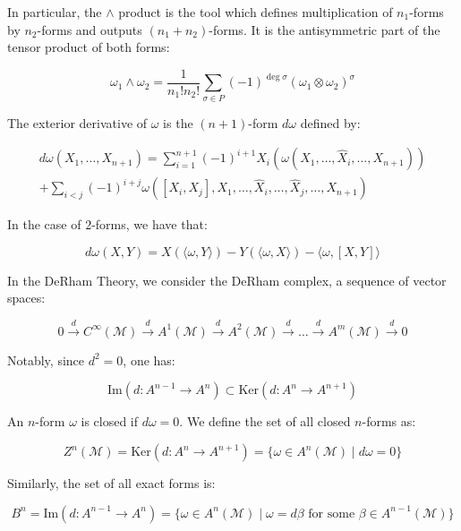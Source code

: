 \noindent In particular, the $\wedge$ product is the tool which defines multiplication of $n_{1}$-forms by $n_{2}$-forms and outputs $(n_{1} + n_{2})$-forms. It is the antisymmetric part of the tensor product of both forms:

\[
\omega_{1} \wedge \omega_{2} = \frac{1}{n_{1}! n_{2}!} \sum_{\sigma \in P} (-1)^{\deg \sigma} (\omega_{1} \otimes \omega_{2})^{\sigma}
\]

\begin{defn}
The exterior derivative of $\omega$ is the $(n+1)$-form $d \omega$ defined by:

\begin{align}
d\omega(X_{1}, \dots, X_{n+1}) = \sum_{i=1}^{n+1} (-1)^{i+1} X_{i}(\omega(X_{1}, \dots, \hat{X}_{i}, \dots, X_{n+1}))  \\
+ \sum_{i < j} (-1)^{i+j} \omega([X_{i}, X_{j}], X_{1}, \dots, \hat{X}_{i}, \dots, \hat{X}_{j}, \dots, X_{n+1})
\end{align}
\end{defn} 

\begin{remark}
\noindent In the case of $2$-forms, we have that:

\[
d \omega(X,Y) = X(\langle \omega, Y \rangle) - Y(\langle \omega, X \rangle) - \langle \omega, [X,Y] \rangle
\]
\end{remark}

\noindent In the DeRham Theory, we consider the DeRham complex, a sequence of vector spaces:

\[
0 \xrightarrow{d} C^{\infty}(\mathcal{M}) \xrightarrow{d} A^{1}(\mathcal{M}) \xrightarrow{d} A^2(\mathcal{M}) \xrightarrow{d} \dots \xrightarrow{d} A^{m}(\mathcal{M}) \xrightarrow{d} 0
\]

\noindent Notably, since $d^2 = 0$, one has:

\[
\text{Im}(d: A^{n-1} \to A^{n}) \subset \text{Ker}(d: A^{n} \to A^{n+1})
\]

\noindent An $n$-form $\omega$ is closed if $d \omega = 0$. We define the set of all closed $n$-forms as:

\[
Z^{n}(\mathcal{M}) = \text{Ker}(d: A^{n} \to A^{n+1}) = \{\omega \in A^{n}(\mathcal{M}) \; | \; d\omega = 0\}
\]

\noindent Similarly, the set of all exact forms is:

\[
B^{n} = \text{Im}(d: A^{n-1} \to A^{n}) = \{\omega \in A^{n}(\mathcal{M}) \; | \; \omega = d \beta \text{ for some } \beta \in A^{n-1}(\mathcal{M}) \}
\]

